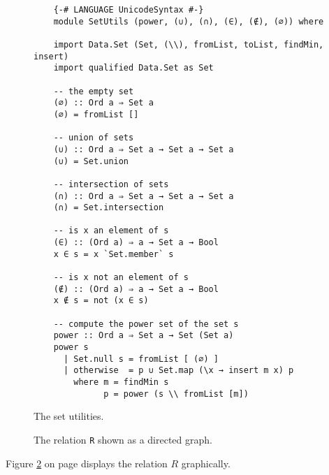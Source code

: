 \begin{figure}[!ht]
\centering
\begin{verbatim}
    {-# LANGUAGE UnicodeSyntax #-}
    module SetUtils (power, (∪), (∩), (∈), (∉), (∅)) where
    
    import Data.Set (Set, (\\), fromList, toList, findMin, insert)
    import qualified Data.Set as Set
    
    -- the empty set
    (∅) :: Ord a ⇒ Set a
    (∅) = fromList []
    
    -- union of sets
    (∪) :: Ord a ⇒ Set a → Set a → Set a
    (∪) = Set.union
    
    -- intersection of sets
    (∩) :: Ord a ⇒ Set a → Set a → Set a
    (∩) = Set.intersection
    
    -- is x an element of s
    (∈) :: (Ord a) ⇒ a → Set a → Bool
    x ∈ s = x `Set.member` s
    
    -- is x not an element of s
    (∉) :: (Ord a) ⇒ a → Set a → Bool
    x ∉ s = not (x ∈ s)
    
    -- compute the power set of the set s
    power :: Ord a ⇒ Set a → Set (Set a)
    power s
      | Set.null s = fromList [ (∅) ]
      | otherwise  = p ∪ Set.map (\x → insert m x) p 
        where m = findMin s
              p = power (s \\ fromList [m])
\end{verbatim}
\vspace*{-0.3cm}
\caption{The set utilities.}
\label{fig:SetUtils.hs}
\end{figure}


\begin{figure}[h]
  \centering


  \caption{The relation \texttt{R} shown as a directed graph.}
  \label{fig:wolf-goat-cabbage.pdf}
\end{figure}



\noindent
Figure \ref{fig:wolf-goat-cabbage.pdf} on page \pageref{fig:wolf-goat-cabbage.pdf} displays the relation $R$ graphically.

